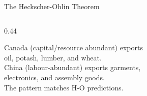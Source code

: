 \documentclass[aspectratio=169]{beamer}
\begin{document}
\begin{frame}[shrink=13]{The Heckscher-Ohlin Theorem}
\begin{columns}[T]
\begin{column}{0.44\textwidth}
\vspace{0.3em}
\begin{canadex}
\footnotesize
Canada (capital/resource abundant) exports\\
oil, potash, lumber, and wheat.\\[0.2em]
China (labour-abundant) exports garments,\\
electronics, and assembly goods.\\[0.2em]
The pattern matches H-O predictions.
\end{canadex}
\end{column}
\end{columns}
\end{frame}

\end{document}

